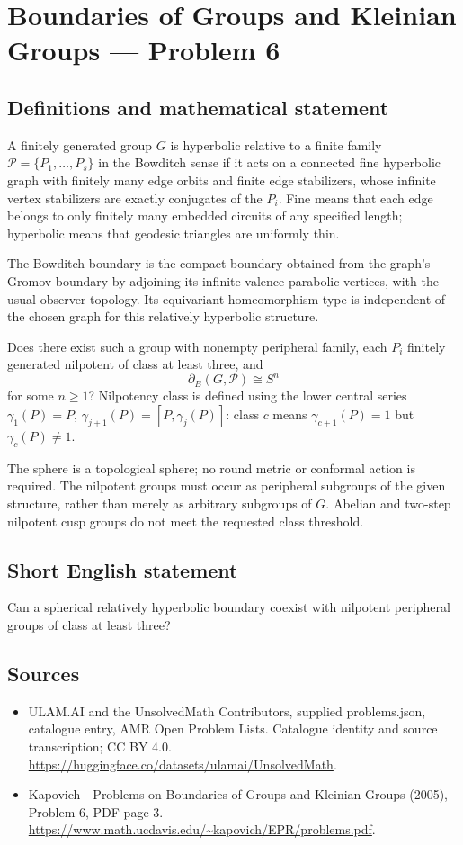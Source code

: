 \documentclass[11pt,a4paper]{article}
\begin{document}
\section*{Boundaries of Groups and Kleinian Groups — Problem 6}\label{statement}

\subsection{Definitions and mathematical statement}
A finitely generated group $G$ is hyperbolic relative to a finite family $\mathcal P=\{P_1,\ldots,P_s\}$ in the Bowditch sense if it acts on a connected fine hyperbolic graph with finitely many edge orbits and finite edge stabilizers, whose infinite vertex stabilizers are exactly conjugates of the $P_i$. Fine means that each edge belongs to only finitely many embedded circuits of any specified length; hyperbolic means that geodesic triangles are uniformly thin.

The Bowditch boundary is the compact boundary obtained from the graph's Gromov boundary by adjoining its infinite-valence parabolic vertices, with the usual observer topology. Its equivariant homeomorphism type is independent of the chosen graph for this relatively hyperbolic structure.

Does there exist such a group with nonempty peripheral family, each $P_i$ finitely generated nilpotent of class at least three, and
\[
 \partial_B(G,\mathcal P)\cong S^n
\]
for some $n\geq1$? Nilpotency class is defined using the lower central series $\gamma_1(P)=P$, $\gamma_{j+1}(P)=[P,\gamma_j(P)]$: class $c$ means $\gamma_{c+1}(P)=1$ but $\gamma_c(P)\ne1$.

The sphere is a topological sphere; no round metric or conformal action is required. The nilpotent groups must occur as peripheral subgroups of the given structure, rather than merely as arbitrary subgroups of $G$. Abelian and two-step nilpotent cusp groups do not meet the requested class threshold.
\subsection{Short English statement}
Can a spherical relatively hyperbolic boundary coexist with nilpotent peripheral groups of class at least three?
\subsection{Sources}
\begin{itemize}
\item[S1] ULAM.AI and the UnsolvedMath Contributors, supplied problems.json, catalogue entry, AMR Open Problem Lists. Catalogue identity and source transcription; CC BY 4.0.
\url{https://huggingface.co/datasets/ulamai/UnsolvedMath}.
\item[S2] Kapovich - Problems on Boundaries of Groups and Kleinian Groups (2005), Problem 6, PDF page 3. 
\url{https://www.math.ucdavis.edu/~kapovich/EPR/problems.pdf}.
\end{itemize}
\end{document}
